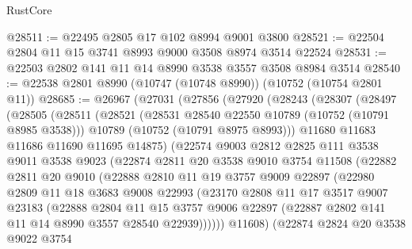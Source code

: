 \begin{lexlean}{RustCore}
\begin{coremodule}
@28511 := @22495 @2805 @17 @102 @8994 @9001 @3800
@28521 := @22504 @2804 @11 @15 @3741 @8993 @9000 @3508 @8974 @3514 @22524
@28531 := @22503 @2802 @141 @11 @14 @8990 @3538 @3557 @3508 @8984 @3514
@28540 := @22538 @2801 @8990 (@10747 (@10748 @8990)) (@10752 (@10754 @2801 @11))
@28685 := @26967
    (@27031
      (@27856
        (@27920
          (@28243
            (@28307
              (@28497
                (@28505
                  (@28511
                    (@28521
                      (@28531 @28540 @22550 @10789 (@10752 (@10791 @8985 @3538)))
                      @10789
                      (@10752 (@10791 @8975 @8993)))
                    @11680
                    @11683
                    @11686
                    @11690
                    @11695
                    @14875)
                  (@22574
                    @9003
                    @2812
                    @2825
                    @111
                    @3538
                    @9011
                    @3538
                    @9023
                    (@22874
                      @2811
                      @20
                      @3538
                      @9010
                      @3754
                      @11508
                      (@22882
                        @2811
                        @20
                        @9010
                        (@22888
                          @2810
                          @11
                          @19
                          @3757
                          @9009
                          @22897
                          (@22980
                            @2809
                            @11
                            @18
                            @3683
                            @9008
                            @22993
                            (@23170
                              @2808
                              @11
                              @17
                              @3517
                              @9007
                              @23183
                              (@22888
                                @2804
                                @11
                                @15
                                @3757
                                @9006
                                @22897
                                (@22887 @2802 @141 @11 @14 @8990 @3557 @28540 @22939))))))
                      @11608)
                    (@22874
                      @2824
                      @20
                      @3538
                      @9022
                      @3754

\end{coremodule}
\end{lexlean}
